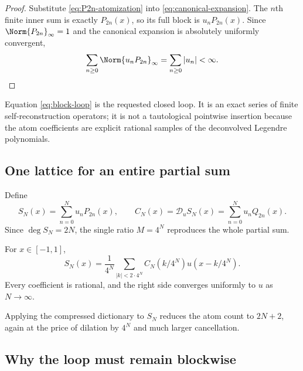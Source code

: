 \documentclass[11pt,oneside]{article}
\numberwithin{equation}{section}
\theoremstyle{definition}
\theoremstyle{remark}
\newcommand{\Dscr}{\mathscr D_u}
\begin{document}
\begin{proof}
Substitute \eqref{eq:P2n-atomization} into
\eqref{eq:canonical-expansion}.  The $n$th finite inner sum is exactly
$P_{2n}(x)$, so its full block is $u_nP_{2n}(x)$.  Since
$\Norm{P_{2n}}_\infty=1$ and the canonical expansion is absolutely uniformly
convergent,
\[
 \sum_{n\ge0}\Norm{u_nP_{2n}}_\infty=\sum_{n\ge0}|u_n|<\infty.
\]
\end{proof}

Equation \eqref{eq:block-loop} is the requested closed loop.  It is an exact
series of finite self-reconstruction operators; it is not a tautological
pointwise insertion because the atom coefficients are explicit rational
samples of the deconvolved Legendre polynomials.

\subsection{One lattice for an entire partial sum}

Define
\begin{equation}
 S_N(x)=\sum_{n=0}^{N}u_nP_{2n}(x),
 \qquad
 C_N(x)=\Dscr S_N(x)=\sum_{n=0}^{N}u_nQ_{2n}(x).
 \label{eq:SN-CN}
\end{equation}
Since $\deg S_N=2N$, the single ratio $M=4^N$ reproduces the whole partial sum.

\begin{corollary}
\label{cor:fixed-scale}
For $x\in[-1,1]$,
\begin{equation}
 \boxed{
 S_N(x)=\frac1{4^N}
 \sum_{|k|<2\cdot4^N}C_N(k/4^N)u(x-k/4^N).}
 \label{eq:fixed-scale-loop}
\end{equation}
Every coefficient is rational, and the right side converges uniformly to $u$
as $N\to\infty$.
\end{corollary}

Applying the compressed dictionary to $S_N$ reduces the atom count to
$2N+2$, again at the price of dilation by $4^N$ and much larger cancellation.

\subsection{Why the loop must remain blockwise}
\end{document}
